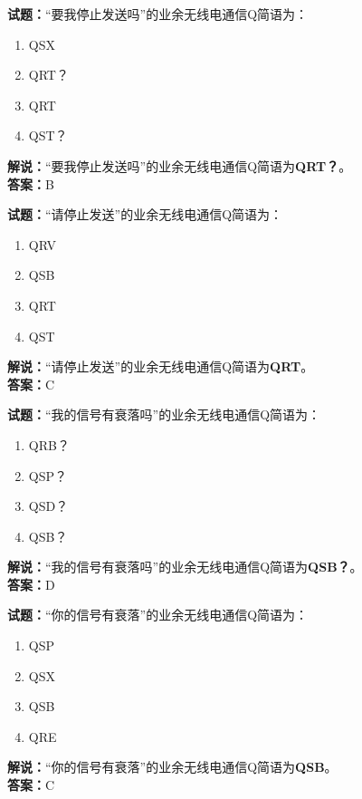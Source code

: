 \documentclass{ctexbook}
\begin{document}
\vspace{1em}

\textbf{试题：}“要我停止发送吗”的业余无线电通信Q简语为：
\begin{enumerate}[leftmargin=3em]
  \item QSX
  \item QRT？
  \item QRT
  \item QST？
\end{enumerate}
\noindent\textbf{解说：}“要我停止发送吗”的业余无线电通信Q简语为\textbf{QRT？}。\\\noindent\textbf{答案：}B

\vspace{1em}

\textbf{试题：}“请停止发送”的业余无线电通信Q简语为：
\begin{enumerate}[leftmargin=3em]
  \item QRV
  \item QSB
  \item QRT
  \item QST
\end{enumerate}
\noindent\textbf{解说：}“请停止发送”的业余无线电通信Q简语为\textbf{QRT}。\\\noindent\textbf{答案：}C

\vspace{1em}

\textbf{试题：}“我的信号有衰落吗”的业余无线电通信Q简语为：
\begin{enumerate}[leftmargin=3em]
  \item QRB？
  \item QSP？
  \item QSD？
  \item QSB？
\end{enumerate}
\noindent\textbf{解说：}“我的信号有衰落吗”的业余无线电通信Q简语为\textbf{QSB？}。\\\noindent\textbf{答案：}D

\vspace{1em}

\textbf{试题：}“你的信号有衰落”的业余无线电通信Q简语为：
\begin{enumerate}[leftmargin=3em]
  \item QSP
  \item QSX
  \item QSB
  \item QRE
\end{enumerate}
\noindent\textbf{解说：}“你的信号有衰落”的业余无线电通信Q简语为\textbf{QSB}。\\\noindent\textbf{答案：}C
\end{document}

